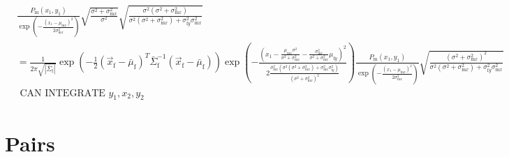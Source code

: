 \documentclass{article}
\newcommand{\x}[1]{\text{#1}}
\begin{document}
\begin{landscape}
\begin{align*}
\\&\frac{P_\x{m}(x_1,y_1)}{\exp\left(-\frac{(x_1-\mu_{\x{m}x})^2}{2\sigma_{\x{m}x}^2}\right)}\sqrt{\frac{\sigma^2+\sigma_{\x{m}x}^2}{\sigma^2}}\sqrt{\frac{\sigma^2(\sigma^2+\sigma_{\x{m}x}^2)}{\sigma^2(\sigma^2+\sigma_{\x{m}x}^2)+\sigma_{\x{f}y}^2\sigma_{\x{m}x}^2}}
\\&=\frac{1}{2\pi\sqrt{|\bar{\Sigma}_{\x{f}}|}}\exp\left(-\frac{1}{2}(\vec{x}_\x{f}-\bar{\mu}_{\x{f}})^T\bar{\Sigma}_\x{f}^{-1}(\vec{x}_\x{f}-\bar{\mu}_\x{f})\right)\exp\left(-\frac{\left(x_1-\frac{\mu_{\x{m}x}\sigma^2}{\sigma^2+\sigma_{\x{m}x}^2}-\frac{\sigma_{\x{m}x}^2}{\sigma^2+\sigma_{\x{m}x}^2}\mu_{\x{f}y}\right)^2}{2\frac{\sigma_{\x{m}x}^2(\sigma^2(\sigma^2+\sigma_{\x{m}x}^2)+\sigma_{\x{m}x}^2\sigma_{\x{f}y}^2)}{(\sigma^2+\sigma_{\x{m}x}^2)^2}}\right)\frac{P_\x{m}(x_1,y_1)}{\exp\left(-\frac{(x_1-\mu_{\x{m}x})^2}{2\sigma_{\x{m}x}^2}\right)}\sqrt{\frac{(\sigma^2+\sigma_{\x{m}x}^2)^2}{\sigma^2(\sigma^2+\sigma_{\x{m}x}^2)+\sigma_{\x{f}y}^2\sigma_{\x{m}x}^2}} 
\\&\text{ CAN INTEGRATE } y_1,x_2,y_2
\end{align*}

\section{Pairs } 

\end{landscape}
\end{document}
